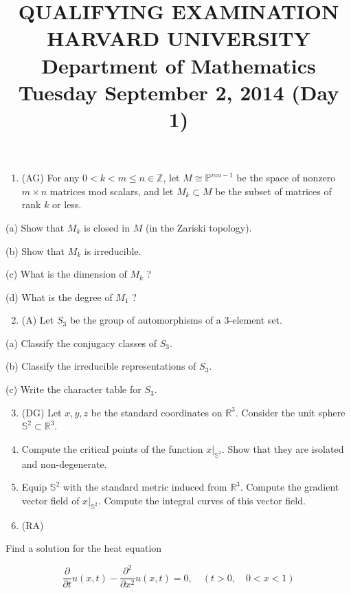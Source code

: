 \documentclass[10pt]{article}
\title{QUALIFYING EXAMINATION 
 HARVARD UNIVERSITY 
 Department of Mathematics 
 Tuesday September 2, 2014 (Day 1) }
\author{}
\date{}
\begin{document}
\maketitle
\begin{enumerate}
  \item (AG) For any $0<k<m \leq n \in \mathbb{Z}$, let $M \cong \mathbb{P}^{m n-1}$ be the space of nonzero $m \times n$ matrices mod scalars, and let $M_{k} \subset M$ be the subset of matrices of rank $k$ or less.
\end{enumerate}

(a) Show that $M_{k}$ is closed in $M$ (in the Zariski topology).

(b) Show that $M_{k}$ is irreducible.

(c) What is the dimension of $M_{k}$ ?

(d) What is the degree of $M_{1}$ ?

\begin{enumerate}
  \setcounter{enumi}{1}
  \item (A) Let $S_{3}$ be the group of automorphisms of a 3-element set.
\end{enumerate}

(a) Classify the conjugacy classes of $S_{3}$.

(b) Classify the irreducible representations of $S_{3}$.

(c) Write the character table for $S_{3}$.

\begin{enumerate}
  \setcounter{enumi}{2}
  \item (DG) Let $x, y, z$ be the standard coordinates on $\mathbb{R}^{3}$. Consider the unit sphere $\mathbb{S}^{2} \subset \mathbb{R}^{3}$.

  \item Compute the critical points of the function $\left.x\right|_{\mathbb{S}^{2}}$. Show that they are isolated and non-degenerate.

  \item Equip $\mathbb{S}^{2}$ with the standard metric induced from $\mathbb{R}^{3}$. Compute the gradient vector field of $\left.x\right|_{\mathbb{S}^{2}}$. Compute the integral curves of this vector field.

  \item (RA)

\end{enumerate}

Find a solution for the heat equation

$$
\frac{\partial}{\partial t} u(x, t)-\frac{\partial^{2}}{\partial x^{2}} u(x, t)=0, \quad(t>0, \quad 0<x<1)
$$
\end{document}
